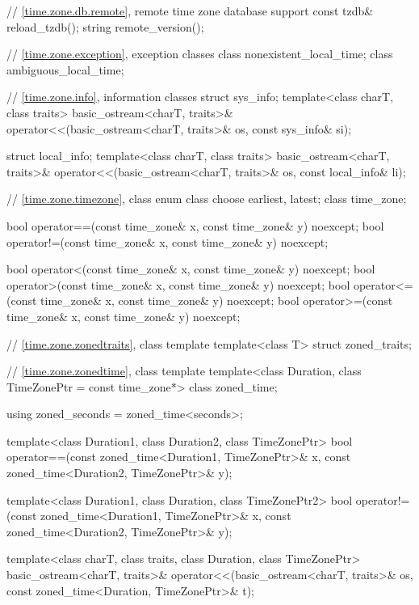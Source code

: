 \begin{codeblock}
{{    // \ref{time.zone.db.remote}, remote time zone database support
    const tzdb& reload_tzdb();
    string remote_version();

    // \ref{time.zone.exception}, exception classes
    class nonexistent_local_time;
    class ambiguous_local_time;

    // \ref{time.zone.info}, information classes
    struct sys_info;
    template<class charT, class traits>
      basic_ostream<charT, traits>&
        operator<<(basic_ostream<charT, traits>& os, const sys_info& si);

    struct local_info;
    template<class charT, class traits>
      basic_ostream<charT, traits>&
        operator<<(basic_ostream<charT, traits>& os, const local_info& li);

    // \ref{time.zone.timezone}, class 
    enum class choose {earliest, latest};
    class time_zone;

    bool operator==(const time_zone& x, const time_zone& y) noexcept;
    bool operator!=(const time_zone& x, const time_zone& y) noexcept;

    bool operator<(const time_zone& x, const time_zone& y) noexcept;
    bool operator>(const time_zone& x, const time_zone& y) noexcept;
    bool operator<=(const time_zone& x, const time_zone& y) noexcept;
    bool operator>=(const time_zone& x, const time_zone& y) noexcept;

    // \ref{time.zone.zonedtraits}, class template 
    template<class T> struct zoned_traits;

    // \ref{time.zone.zonedtime}, class template 
    template<class Duration, class TimeZonePtr = const time_zone*> class zoned_time;

    using zoned_seconds = zoned_time<seconds>;

    template<class Duration1, class Duration2, class TimeZonePtr>
      bool operator==(const zoned_time<Duration1, TimeZonePtr>& x,
                      const zoned_time<Duration2, TimeZonePtr>& y);

    template<class Duration1, class Duration, class TimeZonePtr2>
      bool operator!=(const zoned_time<Duration1, TimeZonePtr>& x,
                      const zoned_time<Duration2, TimeZonePtr>& y);

    template<class charT, class traits, class Duration, class TimeZonePtr>
      basic_ostream<charT, traits>&
        operator<<(basic_ostream<charT, traits>& os,
                   const zoned_time<Duration, TimeZonePtr>& t);

}}
\end{codeblock}
